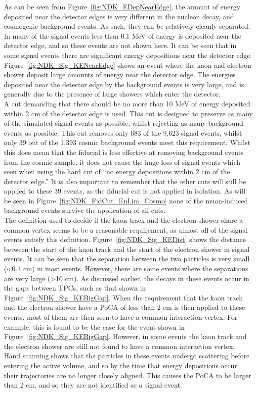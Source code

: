 As can be seen from Figure~\ref{fig:NDK_EDepNearEdge}, the amount of energy deposited near the detector edges is very different in the nucleon decay, and cosmogenic background events. As such, they can be relatively cleanly separated. In many of the signal events less than 0.1 MeV of energy is deposited near the detector edge, and so these events are not shown here. It can be seen that in some signal events there are significant energy depositions near the detector edge. Figure~\ref{fig:NDK_Sig_KENearEdge} shows an event where the kaon and electron shower deposit large amounts of energy near the detector edge. The energies deposited near the detector edge by the background events is very large, and is generally due to the presence of large showers which enter the detector. \\

A cut demanding that there should be no more than 10 MeV of energy deposited within 2 cm of the detector edge is used. This cut is designed to preserve as many of the simulated signal events as possible, whilst rejecting as many background events as possible. This cut removes only 683 of the 9,623 signal events, whilst only 39 out of the 1,393 cosmic background events meet this requirement. Whilst this does mean that the fiducial is less effective at removing background events from the cosmic sample, it does not cause the huge loss of signal events which seen when using the hard cut of ``no energy depositions within 2 cm of the detector edge.'' It is also important to remember that the other cuts will still be applied to these 39 events, as the fiducial cut is not applied in isolation. As will be seen in Figure~\ref{fig:NDK_FidCut_EnLim_Cosmo} none of the muon-induced background events survive the application of all cuts. \\

The definition used to decide if the kaon track and the electron shower share a common vertex seems to be a reasonable requirement, as almost all of the signal events satisfy this definition. Figure~\ref{fig:NDK_Sig_KEDist} shows the distance between the start of the kaon track and the start of the electron shower in signal events. It can be seen that the separation between the two particles is very small (<0.1 cm) in most events. However, there are some events where the separations are very large (>10 cm). As discussed earlier, the decays in these events occur in the gaps between TPCs, such as that shown in Figure~\ref{fig:NDK_Sig_KEBigGap}. When the requirement that the kaon track and the electron shower have a PoCA of less than 2 cm is then applied to these events, most of them are then seen to have a common interaction vertex. For example, this is found to be the case for the event shown in Figure~\ref{fig:NDK_Sig_KEBigGap}. However, in some events the kaon track and the electron shower are still not found to have a common interaction vertex. Hand scanning shows that the particles in these events undergo scattering before entering the active volume, and so by the time that energy depositions occur their trajectories are no longer closely aligned. This causes the PoCA to be larger than 2 cm, and so they are not identified as a signal event. \\

